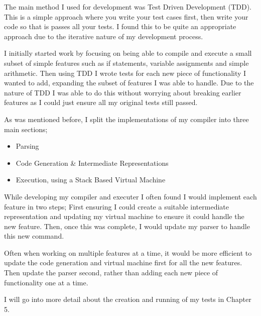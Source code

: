 The main method I used for development was Test Driven Development (TDD). This is a simple approach where you write your test cases first, then write your code so that is passes all your tests. I found this to be quite an appropriate approach due to the iterative nature of my development process. 

I initially started work by focusing on being able to compile and execute a small subset of simple features such as if statements, variable assignments and simple arithmetic. Then using TDD I wrote tests for each new piece of functionality I wanted to add, expanding the subset of features I was able to handle. Due to the nature of TDD I was able to do this without worrying about breaking earlier features as I could just ensure all my original tests still passed.

As was mentioned before, I split the implementations of my compiler into three main sections;

\begin{itemize}
	\item Parsing
	\item Code Generation \& Intermediate Representations 
	\item Execution, using a Stack Based Virtual Machine
\end{itemize}

While developing my compiler and executer I often found I would implement each feature in two steps; First ensuring I could create a suitable intermediate representation and updating my virtual machine to ensure it could handle the new feature. Then, once this was complete, I would update my parser to handle this new command. 

Often when working on multiple features at a time, it would be more efficient to update the code generation and virtual machine first for all the new features. Then update the parser second, rather than adding each new piece of functionality one at a time. 

I will go into more detail about the creation and running of my tests in Chapter 5. 
   